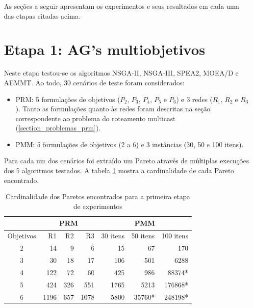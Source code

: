 As seções a seguir apresentam os experimentos e seus resultados em cada uma das etapas citadas acima.

\section{Etapa 1: AG's multiobjetivos}
\label{section_experimentos_etapa1}

Neste etapa testou-se os algoritmos NSGA-II, NSGA-III, SPEA2, MOEA/D e AEMMT. Ao todo, 30 cenários de teste foram considerados:

\begin{itemize}
	\item PRM: 5 formulações de objetivos ($P_2$, $P_3$, $P_4$, $P_5$ e $P_6$) e 3 redes ($R_1$, $R_2$ e $R_3$). Tanto as formulações quanto às redes foram descritas na seção correspondente ao problema do roteamento multicast (\ref{section_problemas_prm}).
	\item PMM: 5 formulações de objetivos (2 a 6) e 3 instâncias (30, 50 e 100 itens).
\end{itemize}

Para cada um dos cenários foi extraído um Pareto através de múltiplas execuções dos 5 algoritmos testados. A tabela \ref{table_exp1_paretos} mostra a cardinalidade de cada Pareto encontrado.

\begin{table}[!htbp]
	\centering
	\caption{Cardinalidade dos Paretos encontrados para a primeira etapa de experimentos}
	\label{table_exp1_paretos}
	\begin{tabular}{c|rrr|rrr}
		& \multicolumn{3}{c|}{\textbf{PRM}} & \multicolumn{3}{c}{\textbf{PMM}} \\ \hline
		Objetivos & R1         & R2       & R3        & 30 itens  & 50 itens & 100 itens \\ \hline
		2         & 14         & 9        & 6         & 15        & 67       & 170       \\
		3         & 30         & 18       & 17        & 106       & 501      & 6288      \\
		4         & 122        & 72       & 60        & 425       & 986      & 88374*    \\
		5         & 424        & 326      & 551       & 1765      & 5213     & 176868*   \\
		6         & 1196       & 657      & 1078      & 5800      & 35760*   & 248198*   \\ \hline
	\end{tabular}
\end{table}

